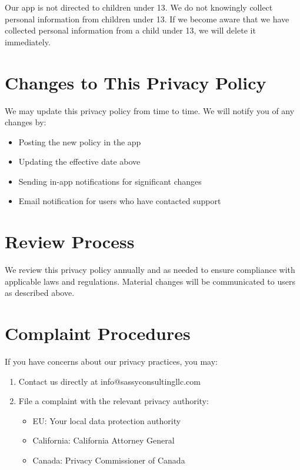 \documentclass[11pt,letterpaper]{article}
\begin{document}
Our app is not directed to children under 13. We do not knowingly collect personal information from children under 13. If we become aware that we have collected personal information from a child under 13, we will delete it immediately.

\section{Changes to This Privacy Policy}

We may update this privacy policy from time to time. We will notify you of any changes by:
\begin{itemize}
    \item Posting the new policy in the app
    \item Updating the effective date above
    \item Sending in-app notifications for significant changes
    \item Email notification for users who have contacted support
\end{itemize}

\section{Review Process}

We review this privacy policy annually and as needed to ensure compliance with applicable laws and regulations. Material changes will be communicated to users as described above.

\section{Complaint Procedures}

If you have concerns about our privacy practices, you may:
\begin{enumerate}
    \item Contact us directly at info@sassyconsultingllc.com
    \item File a complaint with the relevant privacy authority:
    \begin{itemize}
        \item EU: Your local data protection authority
        \item California: California Attorney General
        \item Canada: Privacy Commissioner of Canada
    \end{itemize}
\end{enumerate}
\end{document}
